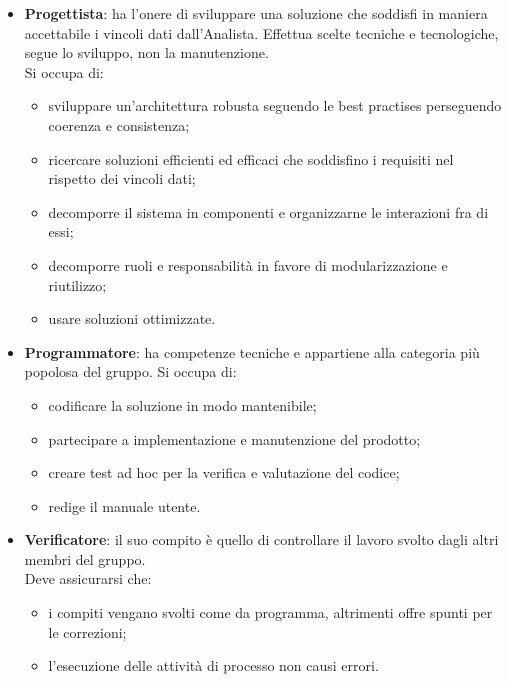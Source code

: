 \begin{itemize}
            Si occupa di:
            \begin{itemize}
                \item mediare fra proponenti/committenti e sviluppatori;
                \item studia le necessità dei proponenti definendo problemi, obiettivi e requisiti soluzione;
                \item etichetta i requisiti in: impliciti/espliciti e opzionali/obbligatori;
                \item redige i file \emph{Studio di Fattibilità} e \emph{Analisi dei Requisiti}.
            \end{itemize}
            \item \textbf{Progettista}: ha l'onere di sviluppare una soluzione che soddisfi in maniera accettabile i vincoli dati dall'Analista.
            Effettua scelte tecniche e tecnologiche, segue lo sviluppo, non la manutenzione. \\
            Si occupa di:
            \begin{itemize}
                \item sviluppare un'architettura robusta seguendo le best practises perseguendo coerenza e consistenza;
                \item ricercare soluzioni efficienti ed efficaci che soddisfino i requisiti nel rispetto dei vincoli dati;
                \item decomporre il sistema in componenti e organizzarne le interazioni fra di essi;
                \item decomporre ruoli e responsabilità in favore di modularizzazione e riutilizzo;
                \item usare soluzioni ottimizzate.
            \end{itemize}
            \item \textbf{Programmatore}: ha competenze tecniche e appartiene alla categoria pi\`u popolosa del gruppo.
            Si occupa di:
            \begin{itemize}
                \item codificare la soluzione in modo mantenibile;
                \item partecipare a implementazione e manutenzione del prodotto;
                \item creare test ad hoc per la verifica e valutazione del codice;
                \item redige il manuale utente.
            \end{itemize}
            \item \textbf{Verificatore}: il suo compito \`e quello di controllare il lavoro svolto dagli altri membri del gruppo. \\
            Deve assicurarsi che:
            \begin{itemize}
                \item i compiti vengano svolti come da programma, altrimenti offre spunti per le correzioni;
                \item l'esecuzione delle attivit\`a di processo non causi errori.
            \end{itemize}
        \end{itemize}

